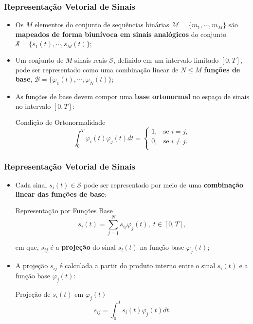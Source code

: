 \documentclass{beamer}
\newcommand{\pag}[1] {\begin{frame}#1\end{frame}}
\begin{document}
\pag{
	\frametitle{Representação Vetorial de Sinais}
	\begin{itemize}
		\item Os $M$ elementos do conjunto de sequências binárias $\mathcal{M} = \{m_{1}, \cdots, m_{M}\}$ são \textbf{mapeados de forma biunívoca em sinais analógicos} do conjunto $\mathcal{S} = \{s_{1}(t),\cdots,s_{M}(t)\}$;
		\item Um conjunto de $M$ sinais reais $\mathcal{S}$, definido em um intervalo limitado $[0,T]$, pode ser representado como uma combinação linear de $N\leq M$ \textbf{funções de base}, $\mathcal{B} = \{\varphi_{1}(t),\cdots,\varphi_{N}(t)\}$;
		\item As funções de base devem compor uma \textbf{base ortonormal} no espaço de sinais no intervalo $[0,T]$:
		\begin{block}{Condição de Ortonormalidade}
			\begin{equation}
				\int_{0}^{T}\varphi_{i}(t)\varphi_{j}(t)dt = \begin{cases}
	    				1, & \text{se } i = j,\\
					0, & \text{se } i \neq j.\\
				\end{cases}
			\end{equation}
		\end{block}
	\end{itemize}
}


\pag{
	\frametitle{Representação Vetorial de Sinais}
	\begin{itemize}
		\item Cada sinal $s_{i}(t) \in \mathcal{S}$ pode ser representado por meio de uma \textbf{combinação linear das funções de base}:
		\begin{block}{Representação por Funções Base}
			\begin{equation}
				s_{i}(t) = \sum_{j = 1}^{N}s_{ij}\varphi_{j}(t),\;t\in [0,T],
			\end{equation}
		\end{block}
em que, $s_{ij}$ é a \textbf{projeção} do sinal $s_{i}(t)$ na função base $\varphi_{j}(t)$;
		\item A projeção $s_{ij}$ é calculada a partir do produto interno entre o sinal $s_{i}(t)$ e a função base $\varphi_{j}(t)$:
		\begin{block}{Projeção de $s_{i}(t)$ em $\varphi_{j}(t)$}
			\begin{equation}
				s_{ij} = \int_{0}^{T}s_{i}(t)\varphi_{j}(t)dt.
			\end{equation}
		\end{block}
	\end{itemize}
}
\end{document}
